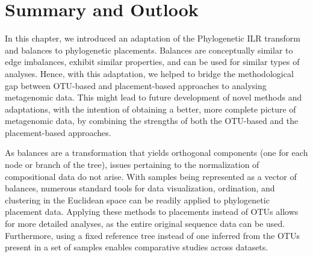 
\section{Summary and Outlook}
\label{ch:Balances:sec:SummaryOutlook}

In this chapter, we introduced an adaptation of the Phylogenetic ILR transform and balances \cite{Silverman2017}
to phylogenetic placements.
Balances are conceptually similar to edge imbalances, exhibit similar properties, 
and can be used for similar types of analyses.
Hence, with this adaptation, we helped to bridge the methodological gap
between OTU-based and placement-based approaches to analysing metagenomic data.
This might lead to future development of novel methods and adaptations,
with the intention of obtaining a better, more complete picture of metagenomic data,
by combining the strengths of both the OTU-based and the placement-based approaches.

As balances are a transformation that yields orthogonal components (one for each node or branch of the tree),
issues pertaining to the normalization of compositional data do not arise.
With samples being represented as a vector of balances,
numerous standard tools for data visualization, ordination, and clustering in the Euclidean space
can be readily applied to phylogenetic placement data.
Applying these methods to placements instead of OTUs allows for more detailed analyses,
as the entire original sequence data can be used.
Furthermore, using a fixed reference tree instead of one inferred from the OTUs present in a set of samples
enables comparative studies across datasets.

